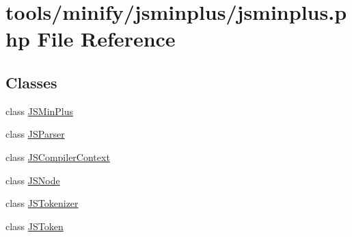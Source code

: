 \hypertarget{jsminplus_8php}{\section{tools/minify/jsminplus/jsminplus.php File Reference}
\label{jsminplus_8php}
}
\subsection*{Classes}
\begin{DoxyCompactItemize}
\item 
class \hyperlink{classJSMinPlus}{J\+S\+Min\+Plus}
\item 
class \hyperlink{classJSParser}{J\+S\+Parser}
\item 
class \hyperlink{classJSCompilerContext}{J\+S\+Compiler\+Context}
\item 
class \hyperlink{classJSNode}{J\+S\+Node}
\item 
class \hyperlink{classJSTokenizer}{J\+S\+Tokenizer}
\item 
class \hyperlink{classJSToken}{J\+S\+Token}
\end{DoxyCompactItemize}
